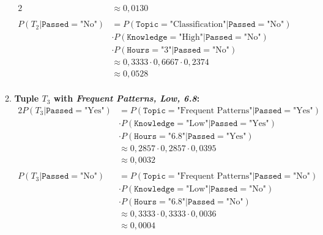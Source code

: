\documentclass[
english,
smallborders
]{i6prcsht}
\newcommand{\Likelihood}[4]{P(\texttt{#1}=\text{"#2"} | \texttt{#3}=\text{"#4"})}
\newcommand{\LikelihoodTuple}[3]{P(#1 | \texttt{#2}=\text{"#3"})}
\begin{document}
\begin{solution}
\begin{enumerate}
\begin{enumerate}
\begin{alignat*}{2}
				                                               & \approx 0,0130                                     \\
				                                               &                                                    \\
				            \LikelihoodTuple{T_2}{Passed}{No}  & =  \Likelihood{Topic}{Classification}{Passed}{No}  \\
				                                               & \cdot \Likelihood{Knowledge}{High}{Passed}{No}     \\
				                                               & \cdot \Likelihood{Hours}{3}{Passed}{No}            \\
				                                               & \approx  0,3333 \cdot 0,6667 \cdot 0,2374          \\
				                                               & \approx 0,0528                                     \\
			            \end{alignat*}

			      \item \textbf{Tuple $T_3$ with \textit{Frequent Patterns, Low, 6.8}:}
			            \begin{alignat*}{2}
				            \LikelihoodTuple{T_3}{Passed}{Yes} & =  \Likelihood{Topic}{Frequent Patterns}{Passed}{Yes} \\
				                                               & \cdot \Likelihood{Knowledge}{Low}{Passed}{Yes}        \\
				                                               & \cdot \Likelihood{Hours}{6.8}{Passed}{Yes}            \\
				                                               & \approx  0,2857 \cdot 0,2857 \cdot 0,0395             \\
				                                               & \approx 0,0032                                        \\
				                                               &                                                       \\
				            \LikelihoodTuple{T_3}{Passed}{No}  & =  \Likelihood{Topic}{Frequent Patterns}{Passed}{No}  \\
				                                               & \cdot \Likelihood{Knowledge}{Low}{Passed}{No}         \\
				                                               & \cdot \Likelihood{Hours}{6.8}{Passed}{No}             \\
				                                               & \approx  0,3333 \cdot 0,3333 \cdot 0,0036             \\
				                                               & \approx 0,0004                                        \\
			            \end{alignat*}
		      \end{enumerate}


\end{enumerate}
\end{solution}
\end{document}
